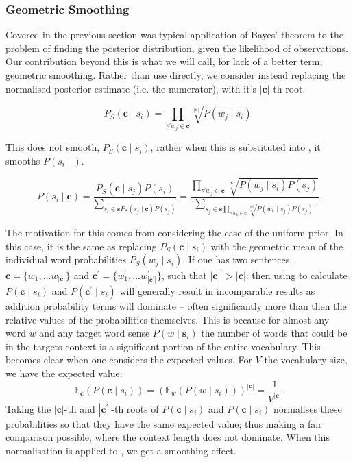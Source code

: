 \documentclass{sig-alternate}
\renewcommand{\c}{\mathbf{c}}
\newcommand{\s}{\mathbf{s}}
\begin{document}
\subsubsection{Geometric Smoothing} \label{smoothing}
Covered in the previous section was typical application of Bayes' theorem to the problem of finding the posterior distribution, given the likelihood of observations.
Our contribution beyond this is what we will call, for lack of a better term, geometric smoothing.
Rather than use  directly, we consider instead replacing the normalised posterior estimate (i.e. the numerator), with it's $|\c|$-th root.

\begin{equation} \label{eq:contrextprobsmooth}
P_S(\c \mid s_{i})=\prod_{\forall w_{j}\in\c}\sqrt[|\c|]{P(w_{j} \mid s_{i})}
\end{equation}

This does not smooth, $P_S(\c \mid s_{i})$, rather when this is substituted into , it smooths $P(s_{i} \mid )$.

\begin{equation} \label{eq:generalwsdsmoothed}
P(s_{i}\mid\c)=\dfrac{P_{S}(\c\mid s_{j})P(s_{i})}{\sum_{s_{i}\in\s P_{S}(s_{j}\mid\c)P(s_{j})}}=\dfrac{\prod_{\forall w_{j}\in\c}\sqrt[|\c|]{P(w_{j}\mid s_{i})P(s_{j})}}{\sum_{s_{j}\in\s\prod_{\forall w_{k}\in\c}\sqrt[|\c|]{P(w_{k}\mid s_{j})P(s_{j})}}}
\end{equation}

The motivation for this comes from considering the case of the uniform prior.
In this case, it is the same as replacing $P_S(\c \mid s_{i})$ with the geometric mean of the individual word probabilities $P_S(w_j \mid s_{i})$.
If one has two sentences, $\c=\{w_1,...w_{|\c|}\}$ and $\c^\prime=\{w_1^\prime,...w^\prime_{|\c^\prime|}\}$, such that $|\c|^\prime > |\c|$:
then using  to calculate $P(\c \mid s_{i})$ and $P(\c^\prime \mid s_{i})$ will generally result in incomparable results as addition probability terms will dominate -- often significantly more than then the relative values of the probabilities themselves. This is because for almost any word $w$ and any target word sense $P(w \mid \s_i)$ the number of words that could be in the targets context is a significant portion of the entire vocabulary.
This becomes clear when one considers the expected values. For $V$ the vocabulary size, we have the expected value:
\begin{equation} \label{eq:expectcontexprob}
\mathbb{E}_\c(P(\c \mid s_{i}))
=(\mathbb{E}_w(P(w \mid s_i)))^{|\c|}
= \frac{1}{V^{|\c|}}
\end{equation}
Taking the $|\c|$-th and $|\c^\prime|$-th roots of $P(\c \mid s_{i})$ and $P(\c \mid s_{i})$ normalises these probabilities so that they have the same expected value; thus making a fair comparison possible, where the context length does not dominate.
When this normalisation is applied to , we get a smoothing effect.
\end{document}
